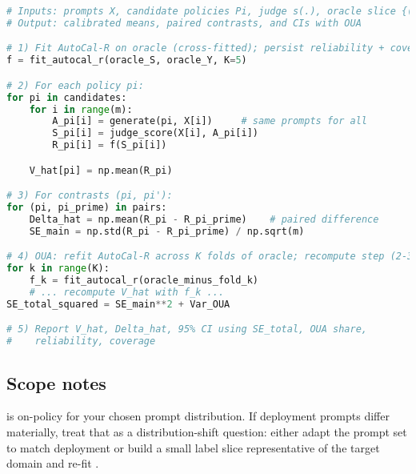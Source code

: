 \begin{lstlisting}[language=Python,caption=DM Recipe]
# Inputs: prompts X, candidate policies Pi, judge s(.), oracle slice {(S, Y)}
# Output: calibrated means, paired contrasts, and CIs with OUA

# 1) Fit AutoCal-R on oracle (cross-fitted); persist reliability + coverage edges
f = fit_autocal_r(oracle_S, oracle_Y, K=5)

# 2) For each policy pi:
for pi in candidates:
    for i in range(m):
        A_pi[i] = generate(pi, X[i])     # same prompts for all
        S_pi[i] = judge_score(X[i], A_pi[i])
        R_pi[i] = f(S_pi[i])

    V_hat[pi] = np.mean(R_pi)

# 3) For contrasts (pi, pi'):
for (pi, pi_prime) in pairs:
    Delta_hat = np.mean(R_pi - R_pi_prime)    # paired difference
    SE_main = np.std(R_pi - R_pi_prime) / np.sqrt(m)

# 4) OUA: refit AutoCal-R across K folds of oracle; recompute step (2-3)
for k in range(K):
    f_k = fit_autocal_r(oracle_minus_fold_k)
    # ... recompute V_hat with f_k ...
SE_total_squared = SE_main**2 + Var_OUA

# 5) Report V_hat, Delta_hat, 95% CI using SE_total, OUA share,
#    reliability, coverage
\end{lstlisting}

\subsection{Scope notes}

\dm{} is on-policy for your chosen prompt distribution. If deployment prompts differ materially, treat that as a distribution-shift question: either adapt the prompt set to match deployment or build a small label slice representative of the target domain and re-fit \autocal.
